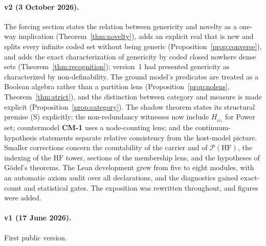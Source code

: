 \documentclass[11pt]{article}
\newcommand{\HF}{\mathrm{HF}}                 \newcommand{\rank}{\operatorname{rank}}
\newcommand{\powset}{\mathcal{P}}
\theoremstyle{definition}
\begin{document}
\paragraph{v2 (3 October 2026).} The forcing section states the relation between genericity and
novelty as a one-way implication (Theorem~\ref{thm:novelty}), adds an explicit real that is new and
splits every infinite coded set without being generic (Proposition~\ref{prop:converse}), and adds
the exact characterization of genericity by coded closed nowhere dense sets
(Theorem~\ref{thm:recognition}); version~1 had presented genericity as characterized by
non-definability. The ground model's predicates are treated as a Boolean algebra rather than a
partition lens (Proposition~\ref{prop:nolens}, Theorem~\ref{thm:strict}), and the distinction
between category and measure is made explicit (Proposition~\ref{prop:category}). The shadow theorem
states its structural premise (S) explicitly; the non-redundancy witnesses now include
$H_{\omega_1}$ for Power set; countermodel \textbf{CM-1} uses a node-counting lens; and the
continuum-hypothesis statements separate relative consistency from the host-model picture. Smaller
corrections concern the countability of the carrier and of $\powset(\HF)$, the indexing of the
$\HF$ tower, sections of the membership lens, and the hypotheses of G\"odel's theorems. The Lean
development grew from five to eight modules, with an automatic axiom audit over all declarations,
and the diagnostics gained exact-count and statistical gates. The exposition was rewritten
throughout, and figures were added.

\paragraph{v1 (17 June 2026).} First public version.
 


\end{document}
